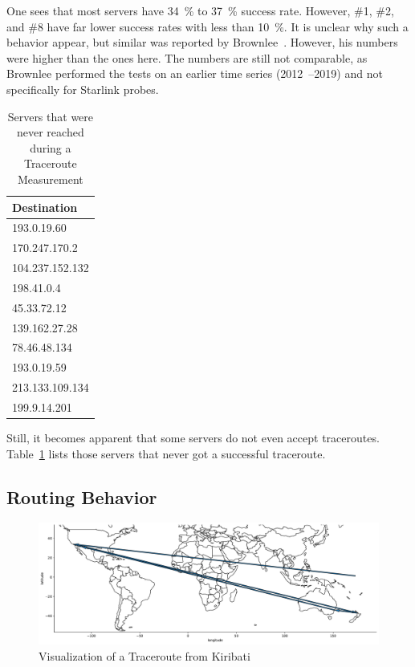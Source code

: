 One sees that most servers have 34~\% to 37~\% success rate. However, \#1, \#2,
and \#8 have far lower success rates with less than 10~\%. It is unclear why
such a behavior appear, but similar was reported by
Brownlee~\cite{Brownlee2021}. However, his numbers were higher than the ones
here. The numbers are still not comparable, as Brownlee performed the tests on
an earlier time series (2012~--2019) and not specifically for Starlink probes.

\begin{table}
	\footnotesize
	\caption{Servers that were never reached during a Traceroute Measurement}
	\label{fig:unreachable-servers}
	\begin{tabular}{l}
		\toprule
		Destination     \\
		\midrule
		193.0.19.60     \\
		170.247.170.2   \\
		104.237.152.132 \\
		198.41.0.4      \\
		45.33.72.12     \\
		139.162.27.28   \\
		78.46.48.134    \\
		193.0.19.59     \\
		213.133.109.134 \\
		199.9.14.201    \\
		\bottomrule
	\end{tabular}
\end{table}

Still, it becomes apparent that some servers do not even accept traceroutes.
Table~\ref{fig:unreachable-servers} lists those servers that never got a
successful traceroute.

\subsection*{Routing Behavior}

\begin{figure}
	\includegraphics[width=\textwidth]{chapters/4-results/traceroute/img/kiribati-example-traceroute.pdf}
	\caption{Visualization of a Traceroute from Kiribati}
	\label{fig:kiribati-example-traceroute}
\end{figure}

